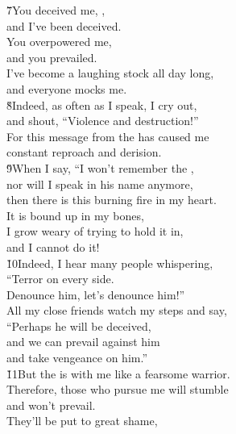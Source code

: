 \begin{poetry}
\poeml \v{7}You deceived me, , \\
\poemll    and I've been deceived. \\
\poeml You overpowered me, \\
\poemll    and you prevailed. \\
\poeml I've become a laughing stock all day long, \\
\poemll    and everyone mocks me. \\
\poeml \v{8}Indeed, as often as I speak, I cry out, \\
\poemll    and shout, ``Violence and destruction!'' \\
\poeml For this message from the  has caused me \\
\poemll    constant reproach and derision. \\
\poeml \v{9}When I say, ``I won't remember the , \\
\poemll    nor will I speak in his name anymore, \\
\poeml then there is this burning fire in my heart. \\
\poemll    It is bound up in my bones, \\
\poeml I grow weary of trying to hold it in, \\
\poemll    and I cannot do it! \\
\poeml \v{10}Indeed, I hear many people whispering, \\
\poemll    ``Terror on every side. \\
\poeml Denounce him, let's denounce him!'' \\
\poemll    All my close friends watch my steps and say, \\
\poeml ``Perhaps he will be deceived, \\
\poemll    and we can prevail against him \\
\poemlll       and take vengeance on him.'' \\
\poeml \v{11}But the  is with me like a fearsome warrior. \\
\poemll    Therefore, those who pursue me will stumble \\
\poemlll       and won't prevail. \\
\poeml They'll be put to great shame, \\

\end{poetry}
